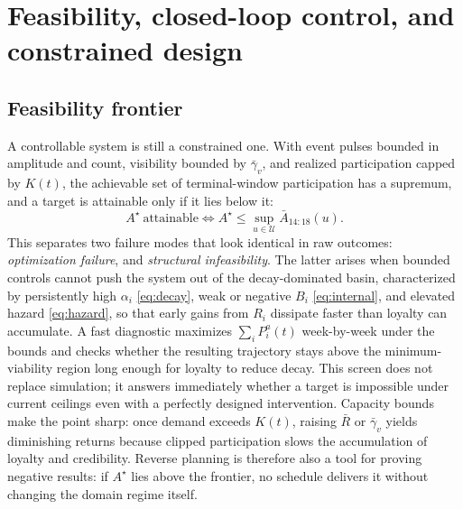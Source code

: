 \documentclass[11pt]{article}
\begin{document}
\section{Feasibility, closed-loop control, and constrained design}\label{sec:feasibility}

\subsection{Feasibility frontier}
A controllable system is still a constrained one. With event pulses bounded in amplitude and count, visibility bounded by $\bar\gamma_v$, and realized participation capped by $K(t)$, the achievable set of terminal-window participation has a supremum, and a target is attainable only if it lies below it:
\begin{equation*}
A^\star\ \text{attainable}\iff A^\star\le\sup_{u\in\mathcal U}\bar A_{14:18}(u).
\end{equation*}
This separates two failure modes that look identical in raw outcomes: \emph{optimization failure}, and \emph{structural infeasibility}. The latter arises when bounded controls cannot push the system out of the decay-dominated basin, characterized by persistently high $\alpha_i$ \eqref{eq:decay}, weak or negative $B_i$ \eqref{eq:internal}, and elevated hazard \eqref{eq:hazard}, so that early gains from $R_i$ dissipate faster than loyalty can accumulate. A fast diagnostic maximizes $\sum_i P^a_i(t)$ week-by-week under the bounds and checks whether the resulting trajectory stays above the minimum-viability region long enough for loyalty to reduce decay. This screen does not replace simulation; it answers immediately whether a target is impossible under current ceilings even with a perfectly designed intervention. Capacity bounds make the point sharp: once demand exceeds $K(t)$, raising $\bar R$ or $\bar\gamma_v$ yields diminishing returns because clipped participation slows the accumulation of loyalty and credibility. Reverse planning is therefore also a tool for proving negative results: if $A^\star$ lies above the frontier, no schedule delivers it without changing the domain regime itself.
\end{document}
